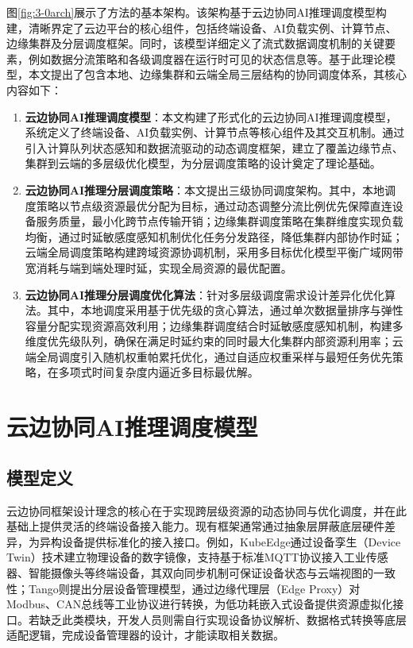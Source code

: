 图\ref{fig:3-0arch}展示了方法的基本架构。该架构基于云边协同AI推理调度模型构建，清晰界定了云边平台的核心组件，包括终端设备、AI负载实例、计算节点、边缘集群及分层调度框架。同时，该模型详细定义了流式数据调度机制的关键要素，例如数据分流策略和各级调度器在运行时可见的状态信息等。基于此理论模型，本文提出了包含本地、边缘集群和云端全局三层结构的协同调度体系，其核心内容如下：

\begin{enumerate}
    \item \textbf{云边协同AI推理调度模型}：本文构建了形式化的云边协同AI推理调度模型，系统定义了终端设备、AI负载实例、计算节点等核心组件及其交互机制。通过引入计算队列状态感知和数据流驱动的动态调度框架，建立了覆盖边缘节点、集群到云端的多层级优化模型，为分层调度策略的设计奠定了理论基础。
    \item \textbf{云边协同AI推理分层调度策略}：本文提出三级协同调度架构。其中，本地调度策略以节点级资源最优分配为目标，通过动态调整分流比例优先保障直连设备服务质量，最小化跨节点传输开销；边缘集群调度策略在集群维度实现负载均衡，通过时延敏感度感知机制优化任务分发路径，降低集群内部协作时延；云端全局调度策略构建跨域资源协调机制，采用多目标优化模型平衡广域网带宽消耗与端到端处理时延，实现全局资源的最优配置。
    \item \textbf{云边协同AI推理分层调度优化算法}：针对多层级调度需求设计差异化优化算法。其中，本地调度采用基于优先级的贪心算法，通过单次数据量排序与弹性容量分配实现资源高效利用；边缘集群调度结合时延敏感度感知机制，构建多维度优先级队列，确保在满足时延约束的同时最大化集群内部资源利用率；云端全局调度引入随机权重帕累托优化，通过自适应权重采样与最短任务优先策略，在多项式时间复杂度内逼近多目标最优解。
\end{enumerate}

\section{云边协同AI推理调度模型}

\subsection{模型定义}

云边协同框架设计理念的核心在于实现跨层级资源的动态协同与优化调度，并在此基础上提供灵活的终端设备接入能力。现有框架通常通过抽象层屏蔽底层硬件差异，为异构设备提供标准化的接入接口。例如，KubeEdge\cite{xiong2018extend}通过设备孪生（Device Twin）技术建立物理设备的数字镜像，支持基于标准MQTT协议接入工业传感器、智能摄像头等终端设备，其双向同步机制可保证设备状态与云端视图的一致性；Tango\cite{bagchi2017tango}则提出分层设备管理模型，通过边缘代理层（Edge Proxy）对Modbus、CAN总线等工业协议进行转换，为低功耗嵌入式设备提供资源虚拟化接口。若缺乏此类模块，开发人员则需自行实现设备协议解析、数据格式转换等底层适配逻辑，完成设备管理器的设计，才能读取相关数据。

